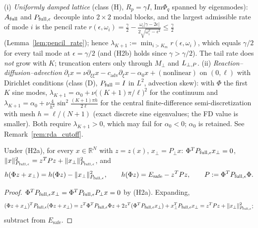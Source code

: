 \begin{remark}
\label{rem:tail_rates}
(i) \emph{Uniformly damped lattice} (class (H), \(R_p = \gamma I\), \(\mathrm{Im}\Phi_q\) spanned by eigenmodes): \(A_{\mathrm{full}}\) and \(P_{\mathrm{full},\epsilon}\) decouple into \(2\times2\) modal blocks, and the largest admissible rate of mode \(i\) is the pencil rate \(r(\epsilon,\omega_i) = \frac{\gamma}{2} - \frac{\omega_i|\gamma - 2\epsilon|}{2\sqrt{\omega_i^2 - \epsilon^2}} \le \frac{\gamma}{2}\) (Lemma~\ref{lem:pencil_rate}); hence \(\lambda_{K+1} := \min_{i > K_m} r(\epsilon, \omega_i)\), which equals \(\gamma/2\) for every tail mode at \(\epsilon = \gamma/2\) (and (H2b) holds since \(\gamma > \gamma/2\)). The tail rate does \emph{not} grow with \(K\); truncation enters only through \(M_\perp\) and \(L_{\perp,P}\). (ii) \emph{Reaction--diffusion--advection} \(\partial_t x = \nu\partial_{\xi\xi}x - c_{\mathrm{adv}}\partial_\xi x - \alpha_0 x + (\text{nonlinear})\) on \((0,\ell)\) with Dirichlet conditions (class (D), \(P_{\mathrm{full}} = I\) in \(L^2\), advection skew): with \(\Phi\) the first \(K\) sine modes, \(\lambda_{K+1} = \alpha_0 + \nu\big((K+1)\pi/\ell\big)^2\) for the continuum and \(\lambda_{K+1} = \alpha_0 + \nu\frac{4}{h^2}\sin^2\frac{(K+1)\pi h}{2\ell}\) for the central finite-difference semi-discretization with mesh \(h = \ell/(N+1)\) (exact discrete sine eigenvalues; the FD value is smaller). Both require \(\lambda_{K+1} > 0\), which may fail for \(\alpha_0 < 0\); \(\alpha_0\) is retained. See Remark~\ref{rem:rda_cutoff}.
\end{remark}

\begin{lemma}
\label{lem:quad_split}
Under (H2a), for every \(x \in \mathbb{R}^N\) with \(z = z(x)\), \(x_\perp = P_\perp x\): \(\Phi^TP_{\mathrm{full},\epsilon} x_\perp = 0\),
\(\|x\|_{P_{\mathrm{full},\epsilon}}^2 = z^T P z + \|x_\perp\|_{P_{\mathrm{full},\epsilon}}^2\), and
\begin{equation}
\label{eq:quad_split}
h(\Phi z + x_\perp) = h(\Phi z) - \|x_\perp\|_{P_{\mathrm{full},\epsilon}}^2, \qquad h(\Phi z) = E_{\mathrm{safe}} - z^T P z, \qquad P := \Phi^TP_{\mathrm{full},\epsilon}\Phi .
\end{equation}
\end{lemma}
\begin{proof}
\(\Phi^TP_{\mathrm{full},\epsilon} x_\perp = \Phi^TP_{\mathrm{full},\epsilon} P_\perp x = 0\) by (H2a). Expanding,
\[
(\Phi z + x_\perp)^TP_{\mathrm{full},\epsilon}(\Phi z + x_\perp) = z^T\Phi^TP_{\mathrm{full},\epsilon}\Phi z + 2z^T(\Phi^TP_{\mathrm{full},\epsilon} x_\perp) + x_\perp^TP_{\mathrm{full},\epsilon} x_\perp = z^TPz + \|x_\perp\|_{P_{\mathrm{full},\epsilon}}^2;
\]
subtract from \(E_{\mathrm{safe}}\).
\end{proof}

